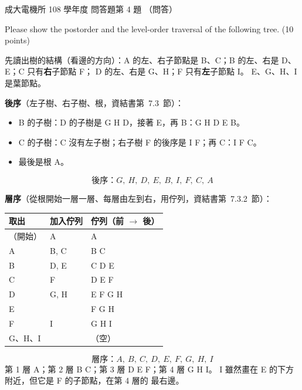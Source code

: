 \begin{pastexam}[label={px:ncku-108-ee-ds-05}]{成大電機所 108 學年度 問答題第 4 題}
（問答）

Please show the postorder and the level-order traversal of the following tree. (10 points)

\begin{center}
\end{center}
\end{pastexam}

\begin{pastsoln}
先讀出樹的結構（看邊的方向）：A 的左、右子節點是 B、C；B 的左、右是 D、E；C 只有\textbf{右}子節點 F；
D 的左、右是 G、H；F 只有\textbf{左}子節點 I。 E、G、H、I 是葉節點。

\textbf{後序}（左子樹、右子樹、根，資結書第~7.3~節）：
\begin{itemize}
\item B 的子樹：D 的子樹是 G H D，接著 E，再 B：G H D E B。
\item C 的子樹：C 沒有左子樹；右子樹 F 的後序是 I F；再 C：I F C。
\item 最後是根 A。
\end{itemize}
\[
\text{後序：} G,\ H,\ D,\ E,\ B,\ I,\ F,\ C,\ A
\]

\textbf{層序}（從根開始一層一層、每層由左到右，用佇列，資結書第~7.3.2~節）：
\begin{center}
\small
\begin{tabular}{lll}
\toprule
取出 & 加入佇列 & 佇列（前 $\to$ 後） \\
\midrule
（開始） & A & A \\
A & B, C & B C \\
B & D, E & C D E \\
C & F & D E F \\
D & G, H & E F G H \\
E & & F G H \\
F & I & G H I \\
G、H、I & & （空） \\
\bottomrule
\end{tabular}
\end{center}
\[
\text{層序：} A,\ B,\ C,\ D,\ E,\ F,\ G,\ H,\ I
\]
第 1 層 A；第 2 層 B C；第 3 層 D E F；第 4 層 G H I。 I 雖然畫在 E 的下方附近，但它是 F 的子節點，在第 4 層的
最右邊。
\end{pastsoln}
